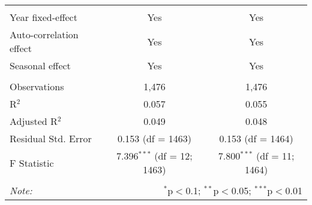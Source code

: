 \begin{table}[!htbp]
\begin{tabular}{@{\extracolsep{5pt}}lcc}
  & & \\ 
\hline \\[-1.8ex] 
Year fixed-effect & Yes & Yes \\ 
Auto-correlation effect & Yes & Yes \\ 
Seasonal effect & Yes & Yes \\ 
\hline \\[-1.8ex] 
Observations & 1,476 & 1,476 \\ 
R$^{2}$ & 0.057 & 0.055 \\ 
Adjusted R$^{2}$ & 0.049 & 0.048 \\ 
Residual Std. Error & 0.153 (df = 1463) & 0.153 (df = 1464) \\ 
F Statistic & 7.396$^{***}$ (df = 12; 1463) & 7.800$^{***}$ (df = 11; 1464) \\ 
\hline 
\hline \\[-1.8ex] 
\textit{Note:}  & \multicolumn{2}{r}{$^{*}$p$<$0.1; $^{**}$p$<$0.05; $^{***}$p$<$0.01} \\ 
\end{tabular} 
\end{table} 
